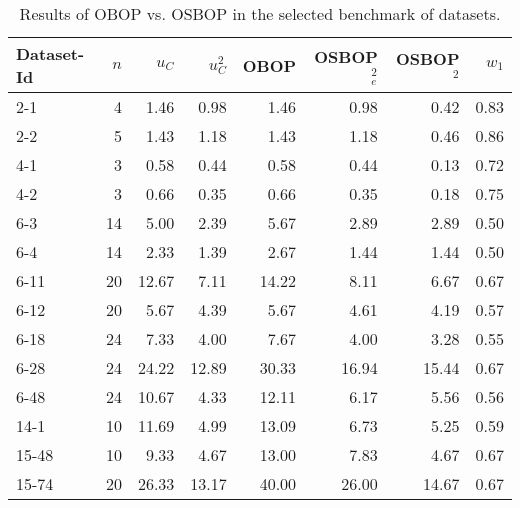 \documentclass[preprint,12pt]{article}
\theoremstyle{definition}
\theoremstyle{remark}
\theoremstyle{example} %
\begin{document}
\begin{table}
\centering
\caption{\label{tab:ResultsOSBOP}Results of OBOP vs. OSBOP in the selected benchmark of datasets.}
\renewcommand{\arraystretch}{1.2} %
\smallskip
\begin{tabular}{lrrrrrrr}\hline
Dataset-Id	&	$n$ &	    $u_C$&$u^2_C$      &	OBOP    &	OSBOP$^2_e$ & OSBOP$^2$	&	$w_1$ \\\hline
2-1	&	4 &		 1.46&0.98  &	 1.46	&   0.98    &   0.42	&   0.83\\   
2-2	&	5 &	     1.43&1.18  &    1.43   &   1.18    &   0.46    &   0.86\\
4-1	&	3 &		 0.58&0.44  &	 0.58	&   0.44    &   0.13	&   0.72\\   
4-2	&	3 &	     0.66&0.35  &    0.66   &   0.35    &   0.18    &   0.75\\
6-3	&	14 &	 5.00&2.39	&    5.67	&   2.89	&   2.89	&   0.50\\ 
6-4	&	14 &	 2.33&1.39	&    2.67	&   1.44    &   1.44 	&   0.50\\ 
6-11 &	20 &	12.67&7.11	&   14.22	&   8.11    &   6.67 	&    0.67\\
6-12 &	20 &	 5.67&4.39	&    5.67	&   4.61    &   4.19 	&   0.57\\ 
6-18 &	24 &	 7.33&4.00	    &    7.67	&   4.00    &   3.28	&   0.55\\ 
6-28 &	24 &	24.22&12.89	&   30.33	&  16.94    &  15.44 	&   0.67\\
6-48 &	24 &	10.67&4.33	&   12.11   &   6.17    &   5.56    &  0.56 \\ 
14-1 &	10 &	11.69&4.99 	&   13.09 	&   6.73    &   5.25 	&   0.59\\
15-48 &	10 &	 9.33&4.67	&   13.00   &   7.83    &   4.67 	&   0.67\\ 
15-74 &	20 &	26.33&13.17	&   40.00	&  26.00    &  14.67 	&   0.67\\ \hline
\end{tabular}
\end{table}
\end{document}
